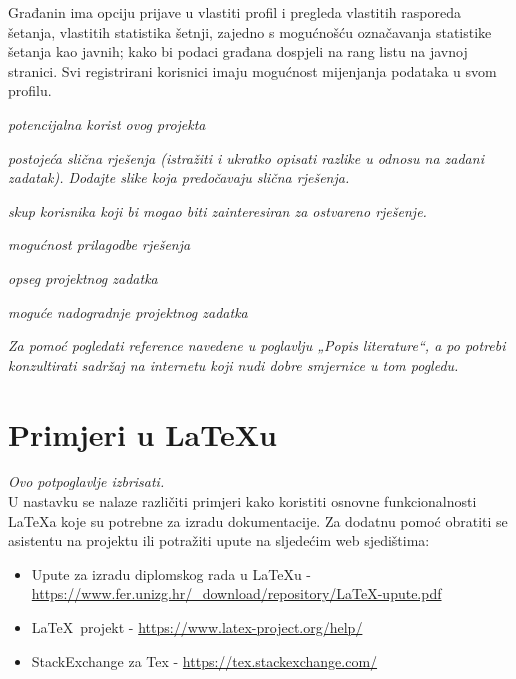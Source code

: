 	Građanin ima opciju prijave u vlastiti profil i pregleda vlastitih rasporeda šetanja,
	vlastitih statistika šetnji, zajedno s mogućnošću označavanja statistike šetanja kao javnih;
	kako bi podaci građana dospjeli na rang listu na javnoj stranici.
	Svi registrirani korisnici imaju mogućnost mijenjanja podataka u svom profilu.\par
	

		
		
		
		\begin{packed_item}
			\item \textit{potencijalna korist ovog projekta}
			\item \textit{postojeća slična rješenja (istražiti i ukratko opisati razlike u odnosu na zadani zadatak). Dodajte slike koja predočavaju slična rješenja.}
			\item \textit{skup korisnika koji bi mogao biti zainteresiran za ostvareno rješenje.}
			\item \textit{mogućnost prilagodbe rješenja }
			\item \textit{opseg projektnog zadatka}
			\item \textit{moguće nadogradnje projektnog zadatka}
		\end{packed_item}
		
		\textit{Za pomoć pogledati reference navedene u poglavlju „Popis literature“, a po potrebi konzultirati sadržaj na internetu koji nudi dobre smjernice u tom pogledu.}
		\eject
		
		\section{Primjeri u \LaTeX u}
		
		\textit{Ovo potpoglavlje izbrisati.}\\

		U nastavku se nalaze različiti primjeri kako koristiti osnovne funkcionalnosti \LaTeX a koje su potrebne za izradu dokumentacije. Za dodatnu pomoć obratiti se asistentu na projektu ili potražiti upute na sljedećim web sjedištima:
		\begin{itemize}
			\item Upute za izradu diplomskog rada u \LaTeX u - \url{https://www.fer.unizg.hr/_download/repository/LaTeX-upute.pdf}
			\item \LaTeX\ projekt - \url{https://www.latex-project.org/help/}
			\item StackExchange za Tex - \url{https://tex.stackexchange.com/}\\
		
		\end{itemize} 	


